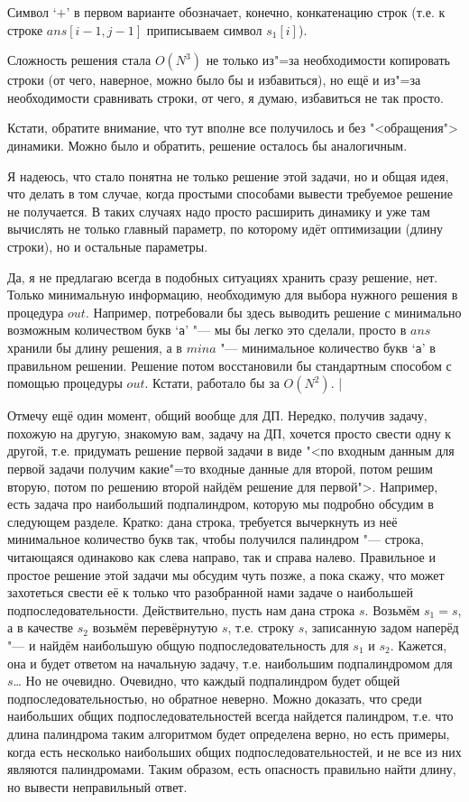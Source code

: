 Символ `$+$' в первом варианте обозначает, конечно, конкатенацию строк (т.е. к строке 
$ans[i-1,j-1]$ приписываем символ $s_1[i]$).

Сложность решения стала $O(N^3)$ не только из"=за необходимости копировать строки (от чего, 
наверное, можно было бы и избавиться), но ещё и из"=за необходимости сравнивать строки, от чего, я 
думаю, избавиться не так просто.

Кстати, обратите внимание, что тут вполне все получилось и без "<обращения"> динамики. Можно было и 
обратить, решение осталось бы аналогичным.

Я надеюсь, что стало понятна не только решение этой задачи, но и общая идея, что делать в том 
случае, когда простыми способами вывести требуемое решение не получается. В таких случаях надо 
просто расширить динамику и уже там вычислять не только главный параметр, по которому идёт 
оптимизации (длину строки), но и остальные параметры. 

Да, я не предлагаю всегда в подобных ситуациях хранить сразу решение, нет. Только минимальную 
информацию, необходимую для выбора нужного решения в процедура $out$. Например, потребовали бы здесь выводить 
решение с минимально возможным количеством букв `\texttt{a}' "--- мы бы легко это сделали, просто в 
$ans$ хранили бы длину решения, а в $mina$ "--- минимальное количество букв `\texttt{a}' в правильном 
решении. Решение потом восстановили бы стандартным способом с помощью процедуры $out$. Кстати, 
работало бы за $O(N^2)$.
|\label{LCS:FirstLex}

Отмечу ещё один момент, общий вообще для ДП. Нередко, получив задачу, похожую на другую, знакомую 
вам, задачу на ДП, хочется просто свести одну к другой, т.е. придумать решение первой задачи в виде 
"<по входным данным для первой задачи получим какие"=то входные данные для второй, потом решим 
вторую, потом по решению второй найдём решение для первой">. Например, есть задача про наибольший 
подпалиндром, которую мы подробно обсудим в следующем разделе. Кратко: дана строка, требуется 
вычеркнуть из неё минимальное количество букв так, чтобы получился палиндром "--- строка, 
читающаяся одинаково как слева направо, так и справа налево. Правильное и простое решение этой 
задачи мы обсудим чуть позже, а пока скажу, что может захотеться свести её к только что разобранной 
нами задаче о наибольшей подпоследовательности. Действительно, пусть нам дана строка $s$. Возьмём 
$s_1=s$, а в качестве $s_2$ возьмём перевёрнутую $s$, т.е. строку $s$, записанную задом наперёд "--- и 
найдём наибольшую общую подпоследовательность для $s_1$ и $s_2$. Кажется, она и будет ответом на начальную задачу, т.е. наибольшим подпалиндромом для $s$\dots{} 
Но не очевидно. Очевидно, что каждый подпалиндром будет общей подпоследовательностью, но обратное неверно. 
Можно доказать, что среди наибольших общих подпоследовательностей всегда найдется палиндром, т.е. 
что длина палиндрома таким алгоритмом будет определена верно, но есть примеры,
когда есть несколько наибольших общих подпоследовательностей, и не все из них являются 
палиндромами. Таким образом, есть опасность правильно найти длину, но вывести неправильный ответ.

